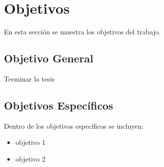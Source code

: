 \chapter{Objetivos}
\label{chp:objetivos}
En esta sección se muestra los objetivos del trabajo.

\section{Objetivo General}
Terminar la tesis

\section{Objetivos Específicos}
Dentro de los objetivos específicos se incluyen:

\begin{itemize}
    \item objetivo 1
    \item objetivo 2
\end{itemize}
